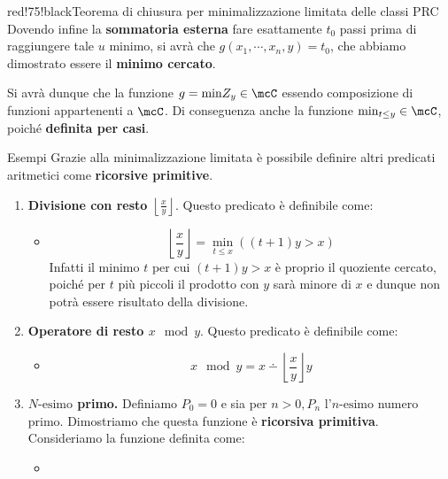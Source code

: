 \begin{halfframedbox} {red!75!black}{Teorema di chiusura per minimalizzazione limitata delle classi PRC}
  Dovendo infine la \textbf{sommatoria esterna} fare esattamente \(t_0\) passi prima di raggiungere tale \(u\) minimo, si avrà che \(g(x_1,\cdots,x_n,y)=t_0\), che abbiamo dimostrato essere il \textbf{minimo cercato}.

  Si avrà dunque che la funzione \(g=\text{min} Z_y\in\mcC\) essendo composizione di funzioni appartenenti a \(\mcC\). Di conseguenza anche la funzione \(\min_{t\leq y}\in\mcC\), poiché \textbf{definita per casi}.
\end{halfframedbox}

\begin{generalbox}[colframe=azure-gradient-3!90!black]{Esempi}
  Grazie alla minimalizzazione limitata è possibile definire altri predicati aritmetici come \textbf{ricorsive primitive}.
  \begin{enumerate}
    \item \textbf{Divisione con resto \(\left\lfloor \frac{x}{y} \right\rfloor\)}. Questo predicato è definibile come:
    \begin{itemize}
      \item []
      \begin{equation}
        \left\lfloor \frac{x}{y} \right\rfloor = \min_{t\leq x} ((t+1)y > x)
      \end{equation}
      Infatti il minimo \(t\) per cui \((t+1)y > x\) è proprio il quoziente cercato, poiché per \(t\) più piccoli il prodotto con \(y\) sarà minore di \(x\) e dunque non potrà essere risultato della divisione.
    \end{itemize}
    \item \textbf{Operatore di resto \(x \mod y\)}. Questo predicato è definibile come:
    \begin{itemize}
      \item []
      \begin{equation}
        x \mod y = x \dotminus \left\lfloor \frac{x}{y} \right\rfloor y
      \end{equation}
    \end{itemize}
    \item \textbf{\(N\text{-esimo}\) primo.} Definiamo \(P_0=0\) e sia per \(n>0, P_n\) l'\(n\text{-esimo}\) numero primo. Dimostriamo che questa funzione è \textbf{ricorsiva primitiva}.
    Consideriamo la funzione definita come:
    \begin{itemize}
     \item []
     \begin{equation}\label{Definizione Ricorsiva Primitiva N-esimo Primo}

\end{equation}
\end{itemize}
\end{enumerate}
\end{generalbox}
